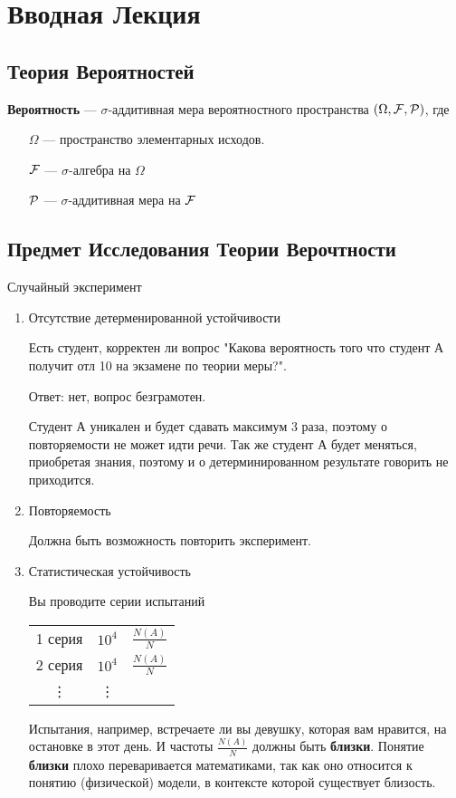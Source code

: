 \section{Вводная Лекция}

\subsection{Теория Вероятностей}

\begin{definition}
	\textbf{Вероятность} --- $\sigma$-аддитивная мера вероятностного пространства $(\Omega, \mathcal{F}, \mathcal{P})$, где
	\begin{enumerate}
		\item[$\Omega$] --- пространство элементарных исходов.
		\item[$\mathcal{F}$]  --- $\sigma$-алгебра на $\Omega$
		\item[$\mathcal{P}$] --- $\sigma$-аддитивная мера на $\mathcal{F}$
	\end{enumerate}
\end{definition}

\subsection{Предмет Исследования Теории Верочтности}

Случайный эксперимент
\begin{enumerate}
	\item Отсутствие детерменированной устойчивости
        \begin{example}
        Есть студент, корректен ли вопрос "Какова вероятность того что студент А получит отл 10 на экзамене по теории меры?". 
        \end{example}
		Ответ: нет, вопрос безграмотен.

        Студент А уникален и будет сдавать максимум 3 раза, поэтому о повторяемости не может идти речи. Так же студент А будет меняться, приобретая знания, поэтому и о детерминированном результате говорить не приходится.

	\item Повторяемость

		Должна быть возможность повторить эксперимент.

	\item Статистическая устойчивость

		Вы проводите серии испытаний
		\begin{center}
		\begin{tabular}{ c c c }
			1 серия & $10^4$ & $\frac{N(A)}{N}$ \\
			2 серия & $10^4$ & $\frac{N(A)}{N}$ \\
			\vdots  & \vdots &\\
		\end{tabular}
		\end{center}
		Испытания, например, встречаете ли вы девушку, которая вам нравится, на остановке в этот день.
		И частоты  $\frac{N(A)}{N}$ должны быть \textbf{близки}. Понятие \textbf{близки} плохо переваривается математиками, так как оно относится к понятию (физической) модели, в контексте которой существует близость.
		
\end{enumerate}

